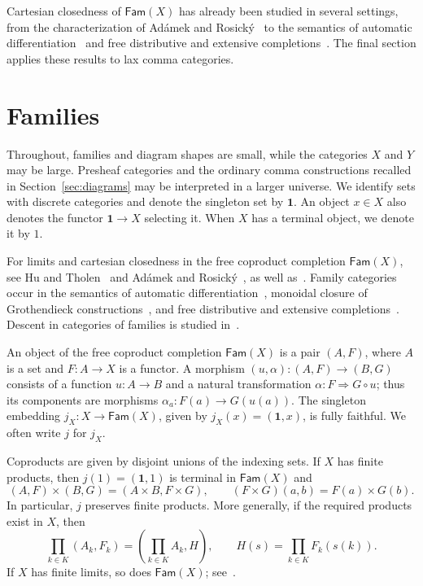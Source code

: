 \documentclass[11pt,a4paper]{amsart}
\theoremstyle{definition}
\numberwithin{equation}{section}
\newcommand{\Fam}{\mathsf{Fam}}
\newcommand{\one}{\mathbf{1}}
\begin{document}
Cartesian closedness of $\Fam(X)$ has already been studied in several settings, from the characterization of Ad\'amek and Rosick\'y~\cite{AR} to the semantics of automatic differentiation~\cite{CHAD} and free distributive and extensive completions~\cite{FED,Dist}. The final section applies these results to lax comma categories.

\section{Families}\label{sec:families}

Throughout, families and diagram shapes are small, while the categories $X$ and $Y$ may be large. Presheaf categories and the ordinary comma constructions recalled in Section~\ref{sec:diagrams} may be interpreted in a larger universe. We identify sets with discrete categories and denote the singleton set by $\one$. An object $x\in X$ also denotes the functor $\one\to X$ selecting it. When $X$ has a terminal object, we denote it by $1$.

For limits and cartesian closedness in the free coproduct completion $\Fam(X)$, see Hu and Tholen~\cite{HT} and Ad\'amek and Rosick\'y~\cite{AR}, as well as~\cite[Sections~6.1 and~6.2]{BJ}. Family categories occur in the semantics of automatic differentiation~\cite{CHAD,ICHAD}, monoidal closure of Grothendieck constructions~\cite{NV}, and free distributive and extensive completions~\cite{FED,Dist}. Descent in categories of families is studied in~\cite{Prezado,CNP,CP}.

An object of the free coproduct completion $\Fam(X)$ is a pair $(A,F)$, where $A$ is a set and $F:A\to X$ is a functor. A morphism $(u,\alpha):(A,F)\to(B,G)$ consists of a function $u:A\to B$ and a natural transformation $\alpha:F\Rightarrow G\circ u$; thus its components are morphisms $\alpha_a:F(a)\to G(u(a))$. The singleton embedding $j_X:X\to\Fam(X)$, given by $j_X(x)=(\one,x)$, is fully faithful. We often write $j$ for $j_X$.

Coproducts are given by disjoint unions of the indexing sets. If $X$ has finite products, then $j(1)=(\one,1)$ is terminal in $\Fam(X)$ and
\begin{equation}\label{eq:products}
 (A,F)\times(B,G)=(A\times B,F\times G),
 \qquad (F\times G)(a,b)=F(a)\times G(b).
\end{equation}
In particular, $j$ preserves finite products. More generally, if the required products exist in $X$, then
\[
 \prod_{k\in K}(A_k,F_k)=\left(\prod_{k\in K}A_k,H\right),
 \qquad H(s)=\prod_{k\in K}F_k(s(k)).
\]
If $X$ has finite limits, so does $\Fam(X)$; see~\cite[Remarks~2.2(1) and~2.3]{AR}.
\end{document}
